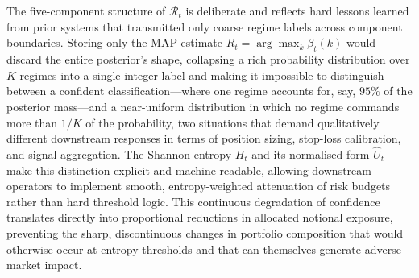 \documentclass[12pt,openany]{book}
\numberwithin{equation}{chapter}
\theoremstyle{plain}
\theoremstyle{definition}
\theoremstyle{remark}
\begin{document}
The five-component structure of $\mathcal{R}_t$ is deliberate and reflects hard lessons learned from prior systems that transmitted only coarse regime labels across component boundaries. Storing only the MAP estimate $\hat{R}_t = \arg\max_k \beta_t(k)$ would discard the entire posterior's shape, collapsing a rich probability distribution over $K$ regimes into a single integer label and making it impossible to distinguish between a confident classification---where one regime accounts for, say, $95\%$ of the posterior mass---and a near-uniform distribution in which no regime commands more than $1/K$ of the probability, two situations that demand qualitatively different downstream responses in terms of position sizing, stop-loss calibration, and signal aggregation. The Shannon entropy $H_t$ and its normalised form $\hat{U}_t$ make this distinction explicit and machine-readable, allowing downstream operators to implement smooth, entropy-weighted attenuation of risk budgets rather than hard threshold logic. This continuous degradation of confidence translates directly into proportional reductions in allocated notional exposure, preventing the sharp, discontinuous changes in portfolio composition that would otherwise occur at entropy thresholds and that can themselves generate adverse market impact.
\end{document}

